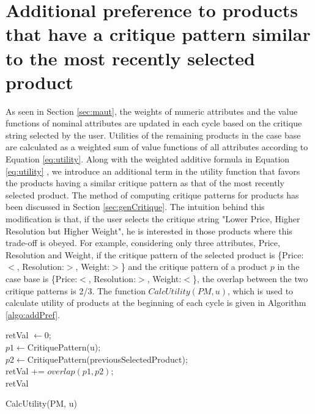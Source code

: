 \section{Additional preference to products that have a critique pattern similar to the most recently selected product}
\label{sec:addTerm}
As seen in Section \ref{sec:maut}, the weights of numeric attributes and the value functions of nominal attributes are updated in each cycle based on the critique string selected by the user.
Utilities of the remaining products in the case base are calculated as a weighted sum of value functions of all attributes according to Equation \ref{eq:utility}.
Along with the weighted additive formula in Equation \ref{eq:utility} , we introduce an additional term in the utility function that favors the products having a similar critique pattern as that of the most recently selected product.
The method of computing critique patterns for products has been discussed in Section \ref{sec:genCritique}.
The intuition behind this modification is that, if the user selects the critique string "Lower Price, Higher Resolution but Higher Weight", he is interested in those products where this trade-off is obeyed.
For example, considering only three attributes, Price, Resolution and Weight, if the critique pattern of the selected product is \{Price:$<$, Resolution:$>$, Weight:$>$\} and the critique pattern of a product $p$ in the case base is \{Price:$<$, Resolution:$>$, Weight:$<$\}, the overlap between the two critique patterns is 2/3.
The function $CalcUtility(PM, u)$, which is used to calculate utility of products at the beginning of each cycle is given in Algorithm \ref{algo:addPref}.

\begin{algorithm}[ht]
  \DontPrintSemicolon

  retVal $\gets 0$;\\
  $p1 \gets $CritiquePattern(u);\\
  $p2 \gets $CritiquePattern(previousSelectedProduct);\\
  retVal += $overlap(p1, p2)$;\\
  \Return retVal
  \caption{CalcUtility(PM, u)}
  \label{algo:addPref}
\end{algorithm}



